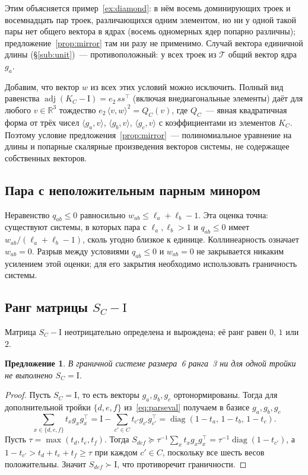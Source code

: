 \documentclass[11pt,a4paper]{article}
\theoremstyle{plain}
\newtheorem{proposition}[theorem]{Предложение}
\theoremstyle{definition}
\theoremstyle{remark}
\DeclareMathOperator{\adj}{adj}
\newcommand{\RR}{\mathbb{R}}
\newcommand{\Id}{\mathrm{I}}
\newcommand{\T}{^{\!\top}}
\begin{document}
Этим объясняется пример~\ref{ex:diamond}: в нём восемь доминирующих троек и
восемнадцать пар троек, различающихся одним элементом, но ни у одной такой
пары нет общего вектора в ядрах (восемь одномерных ядер попарно различны);
предложение~\ref{prop:mirror} там ни разу не применимо. Случай вектора
единичной длины (\S\ref{sub:unit})~--- противоположный: у всех троек из
$\mathcal T$ общий вектор ядра $g_a$.

Добавим, что вектор $w$ из всех этих условий можно исключить. Полный вид
равенства $\adj(K_C-\Id)=e_2\,ss\T$ (включая внедиагональные элементы) даёт
для любого $v\in\RR^3$ тождество $e_2\,\langle v,w\rangle^2=Q_C(v)$, где
$Q_C$~--- явная квадратичная форма от трёх чисел $\langle g_a,v\rangle$,
$\langle g_b,v\rangle$, $\langle g_c,v\rangle$ с коэффициентами из
элементов $K_C$. Поэтому условие предложения~\ref{prop:mirror}~---
полиномиальное уравнение на длины и попарные скалярные произведения
векторов системы, не содержащее собственных векторов.

\subsection{Пара с неположительным парным минором}

Неравенство $q_{ab}\le0$ равносильно $w_{ab}\le\ell_a+\ell_b-1$. Эта оценка
точна: существуют системы, в которых пара с $\ell_a,\ell_b>1$ и $q_{ab}\le0$
имеет $w_{ab}/(\ell_a+\ell_b-1)$, сколь угодно близкое к единице.
Коллинеарность означает $w_{ab}=0$. Разрыв между условиями $q_{ab}\le0$ и
$w_{ab}=0$ не закрывается никаким усилением этой оценки; для его закрытия
необходимо использовать граничность системы.

\subsection{Ранг матрицы $S_C-\Id$}\label{sub:split}

Матрица $S_C-\Id$ неотрицательно определена и вырождена; её ранг равен $0$,
$1$ или~$2$.

\begin{proposition}\label{prop:rank0}
В граничной системе размера~6 ранга~3 ни для одной тройки не выполнено
$S_C=\Id$.
\end{proposition}
\begin{proof}
Пусть $S_C=\Id$, то есть векторы $g_a,g_b,g_c$ ортонормированы. Тогда для
дополнительной тройки $\{d,e,f\}$ из~\eqref{eq:parseval} получаем в базисе
$g_a,g_b,g_c$
\[
  \sum_{x\in\{d,e,f\}}t_xg_xg_x\T=\Id-\sum_{c'\in C}t_{c'}g_{c'}g_{c'}\T
  =\operatorname{diag}(1-t_a,\,1-t_b,\,1-t_c).
\]
Пусть $\tau=\max(t_d,t_e,t_f)$. Тогда
$S_{def}\succeq\tau^{-1}\sum_xt_xg_xg_x\T=\tau^{-1}\operatorname{diag}(1-t_{c'})$,
а $1-t_{c'}>t_d+t_e+t_f\ge\tau$ при каждом $c'\in C$, поскольку все шесть
весов положительны. Значит $S_{def}\succ\Id$, что противоречит граничности.
\end{proof}
\end{document}

